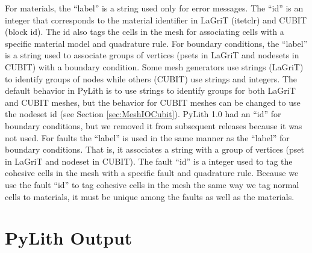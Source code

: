 For materials, the ``label'' is a string used only for error messages.
The ``id'' is an integer that corresponds to the material identifier
in LaGriT (itetclr) and CUBIT (block id). The id also tags the cells
in the mesh for associating cells with a specific material model and
quadrature rule. For boundary conditions, the ``label'' is a string
used to associate groups of vertices (psets in LaGriT and nodesets
in CUBIT) with a boundary condition. Some mesh generators use strings
(LaGriT) to identify groups of nodes while others (CUBIT) use strings
and integers. The default behavior in PyLith is to use strings to
identify groups for both LaGriT and CUBIT meshes, but the behavior
for CUBIT meshes can be changed to use the nodeset id (see Section
\vref{sec:MeshIOCubit}). PyLith 1.0 had an ``id'' for boundary conditions,
but we removed it from subsequent releases because it was not used.
For faults the ``label'' is used in the same manner as the ``label''
for boundary conditions. That is, it associates a string with a group
of vertices (pset in LaGriT and nodeset in CUBIT). The fault ``id''
is a integer used to tag the cohesive cells in the mesh with a specific
fault and quadrature rule. Because we use the fault ``id'' to tag
cohesive cells in the mesh the same way we tag normal cells to materials,
it must be unique among the faults as well as the materials.


\section{PyLith Output}


